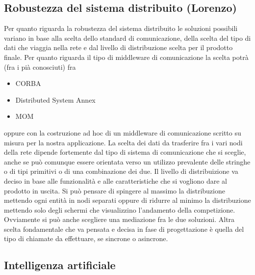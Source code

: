 \subsection{Robustezza del sistema distribuito (Lorenzo)}
Per quanto riguarda la robustezza del sistema distribuito le soluzioni possibili variano in base alla scelta dello standard di comunicazione, della scelta del tipo di dati che viaggia nella rete e dal livello di distribuzione scelta per il prodotto finale.
Per quanto riguarda il tipo di middleware di comunicazione la scelta potr\`{a} (fra i pià conosciuti) fra
\begin{itemize}
\item CORBA
\item Distributed System Annex 
\item MOM
\end{itemize}
oppure con la costruzione ad hoc di un middleware di comunicazione scritto su misura per la nostra applicazione.
La scelta dei dati da trasferire fra i vari nodi della rete dipende fortemente dal tipo di sistema di comunicazione che si sceglie, anche se può comunque essere orientata verso un utilizzo prevalente delle stringhe o di tipi primitivi o di una combinazione dei due. Il livello di distribuizione va deciso in base alle funzionalit\`{a} e alle caratteristiche che si vogliono dare al prodotto in uscita. Si può pensare di spingere al massimo la distribuzione mettendo ogni entit\`{a} in nodi separati oppure di ridurre al minimo la distribuzione mettendo solo degli schermi che visualizzino l'andamento della competizione. Ovviamente si pu\`{o} anche scegliere una mediazione fra le due soluzioni. Altra scelta fondamentale che va pensata e decisa in fase di progettazione \`{e} quella del tipo di chiamate da effettuare, se sincrone o asincrone.
\subsection{Intelligenza artificiale}
